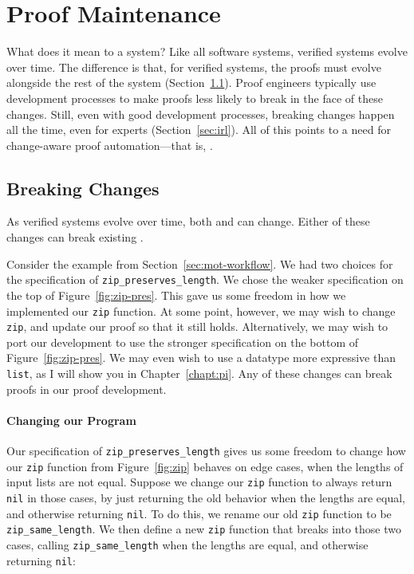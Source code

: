 \section{Proof Maintenance}
\label{sec:mot-mai}

What does it mean to  a  system?
Like all software systems, verified systems evolve over time.
The difference is that, for verified systems, the proofs must evolve alongside the rest of the system (Section~\ref{sec:changes}).
Proof engineers typically use development processes to make proofs less likely to break in the face of these changes.
Still, even with good development processes, breaking changes happen all the time, even for experts (Section~\ref{sec:irl}).
All of this points to a need for change-aware proof automation---that is, .

\subsection{Breaking Changes}
\label{sec:changes}

As verified systems evolve over time, both  and  can change.
Either of these changes can break existing .

Consider the example from Section~\ref{sec:mot-workflow}.
We had two choices for the specification of \lstinline{zip_preserves_length}.
We chose the weaker specification on the top of Figure~\ref{fig:zip-pres}.
This gave us some freedom in how we implemented our \lstinline{zip} function.
At some point, however, we may wish to change \lstinline{zip}, and update our proof so that it still holds.
Alternatively, we may wish to port our development to use the stronger specification on the bottom of Figure~\ref{fig:zip-pres}.
We may even wish to use a datatype more expressive than \lstinline{list}, as I will show you in Chapter~\ref{chapt:pi}.
Any of these changes can break proofs in our proof development.

\paragraph{Changing our Program}

Our specification of \lstinline{zip_preserves_length} gives us some freedom to change how our \lstinline{zip} function from Figure~\ref{fig:zip} behaves on edge cases,
when the lengths of input lists are not equal.
Suppose we change our \lstinline{zip} function to always return \lstinline{nil} in those cases,
by just returning the old behavior when the lengths are equal, and otherwise returning \lstinline{nil}.
To do this, we rename our old \lstinline{zip} function to be \lstinline{zip_same_length}.
We then define a new \lstinline{zip} function that breaks into those two cases, calling \lstinline{zip_same_length}
when the lengths are equal, and otherwise returning \lstinline{nil}:

